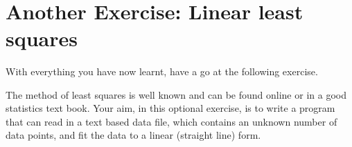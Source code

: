 \documentclass[10pt]{article}
\begin{document}
    \begin{center}
    \end{center}
    { \hspace*{\fill} \\}
    
    \hypertarget{another-exercise-linear-least-squares}{%
\section{Another Exercise: Linear least
squares}\label{another-exercise-linear-least-squares}}

With everything you have now learnt, have a go at the following
exercise.

The method of least squares is well known and can be found online or in
a good statistics text book. Your aim, in this optional exercise, is to
write a program that can read in a text based data file, which contains
an unknown number of data points, and fit the data to a linear (straight
line) form.
\end{document}

